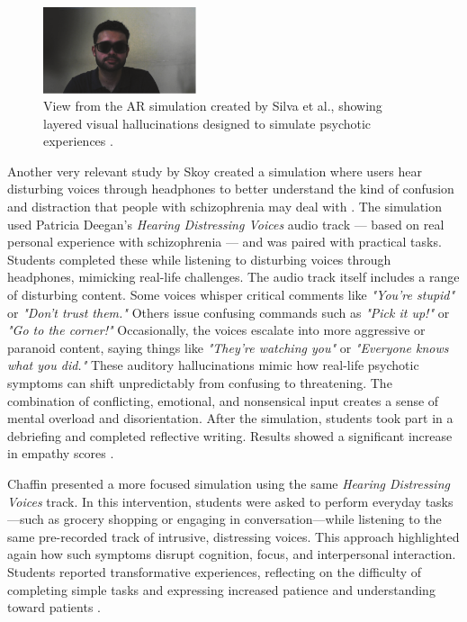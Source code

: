 \begin{figure}[H]
  \centering
  \includegraphics[width=0.4\textwidth]{../../Figures/silva_ar_scene.png}
  \caption{View from the AR simulation created by Silva et al., showing layered visual hallucinations designed to simulate psychotic experiences \cite{Silva2017}.}
  \label{fig:silva_ar_scene}
\end{figure}


\vspace{1em}

Another very relevant study by Skoy \cite{Skoy2016} created a simulation where users hear disturbing voices through headphones to better understand the kind of confusion and distraction that people with schizophrenia may deal with \cite{Skoy2016}. The simulation used Patricia Deegan's \emph{Hearing Distressing Voices} audio track — based on real personal experience with schizophrenia — and was paired with practical tasks. Students completed these while listening to disturbing voices through headphones, mimicking real-life challenges. The audio track itself includes a range of disturbing content. Some voices whisper critical comments like \emph{"You're stupid"} or \emph{"Don't trust them."} Others issue confusing commands such as \emph{"Pick it up!"} or \emph{"Go to the corner!"} Occasionally, the voices escalate into more aggressive or paranoid content, saying things like \emph{"They’re watching you"} or \emph{"Everyone knows what you did."} These auditory hallucinations mimic how real-life psychotic symptoms can shift unpredictably from confusing to threatening. The combination of conflicting, emotional, and nonsensical input creates a sense of mental overload and disorientation. After the simulation, students took part in a debriefing and completed reflective writing. Results showed a significant increase in empathy scores \cite{Skoy2016}.

\vspace{1em}

Chaffin \cite{Chaffin2013} presented a more focused simulation using the same \emph{Hearing Distressing Voices} track. In this intervention, students were asked to perform everyday tasks—such as grocery shopping or engaging in conversation—while listening to the same pre-recorded track of intrusive, distressing voices. This approach highlighted again how such symptoms disrupt cognition, focus, and interpersonal interaction. Students reported transformative experiences, reflecting on the difficulty of completing simple tasks and expressing increased patience and understanding toward patients \cite{Chaffin2013}.

